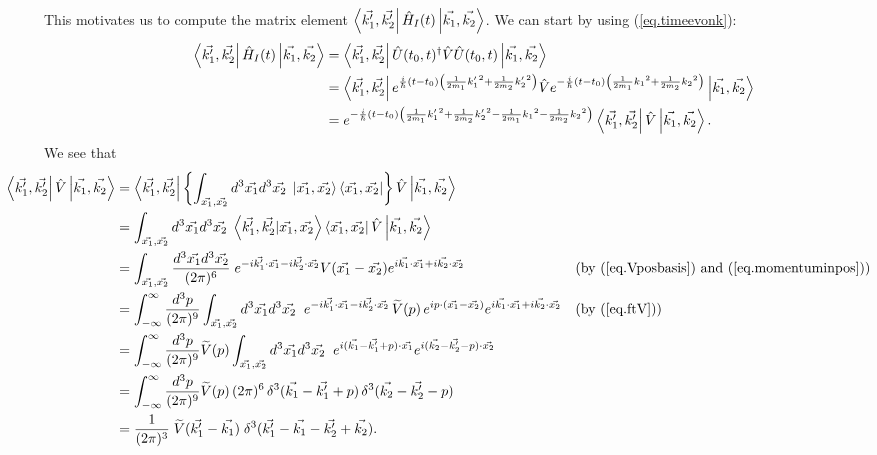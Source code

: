 This motivates us to compute the matrix element \(\left\langle\vec{k_1^\prime}, \vec{k_2^\prime}\right| \hat{H}_I(t)\left|\vec{k_1}, \vec{k_2}\right\rangle\). We can start by using (\ref{eq.timeevonk}):
\begin{align*}
\left\langle\vec{k_1^\prime}, \vec{k_2^\prime}\right| \hat{H}_I(t)\left|\vec{k_1}, \vec{k_2}\right\rangle
&= \left\langle\vec{k_1^\prime}, \vec{k_2^\prime}\right| \hat{U}(t_0, t)^\dagger \hat{V} \hat{U}(t_0, t) \left|\vec{k_1}, \vec{k_2}\right\rangle \nonumber\\
&= \left\langle\vec{k_1^\prime}, \vec{k_2^\prime}\right| e^{\frac{i}{\hbar}\left(t-t_0\right)\left(\frac{1}{2m_1}{{k_1^\prime}}^2 + \frac{1}{2m_2}{{k_2^\prime}}^2\right)} \hat{V} e^{-\frac{i}{\hbar}\left(t-t_0\right)\left(\frac{1}{2m_1}{k_1}^2 + \frac{1}{2m_2}{k_2}^2\right)} \left|\vec{k_1}, \vec{k_2}\right\rangle \nonumber\\
&= e^{-\frac{i}{\hbar}\left(t-t_0\right)\left(\frac{1}{2m_1}{{k_1^\prime}}^2 + \frac{1}{2m_2}{{k_2^\prime}}^2 - \frac{1}{2m_1}{k_1}^2 - \frac{1}{2m_2}{k_2}^2\right)} \left\langle\vec{k_1^\prime}, \vec{k_2^\prime}\right| \hat{V} \left|\vec{k_1}, \vec{k_2}\right\rangle.
\end{align*}
We see that
\begin{align*}
\hspace{-4em}\bra{\vec{k_1^\prime}, \vec{k_2^\prime}} \op{V} \ket{\vec{k_1}, \vec{k_2}} &= \bra{\vec{k_1^\prime}, \vec{k_2^\prime}} \left\{\int_{\vec{x_1}, \vec{x_2}} {d^3 \vec{x_1} d^3 \vec{x_2}\;} \ket{\vec{x_1}, \vec{x_2}}\bra{\vec{x_1}, \vec{x_2}}\right\}\op{V} \ket{\vec{k_1}, \vec{k_2}} \nonumber\\
&= \int_{\vec{x_1}, \vec{x_2}} {d^3 \vec{x_1} d^3 \vec{x_2}\;} \braket{\vec{k_1^\prime}, \vec{k_2^\prime}}{\vec{x_1}, \vec{x_2}}\bra{\vec{x_1}, \vec{x_2}}\op{V} \ket{\vec{k_1}, \vec{k_2}} \nonumber\\
&= \int_{\vec{x_1}, \vec{x_2}} \frac{d^3 \vec{x_1} d^3 \vec{x_2}}{(2\pi)^6}\; e^{-i\vec{k_1^\prime}\cdot \vec{x_1} - i\vec{k_2^\prime}\cdot \vec{x_2}}V(\vec{x_1} - \vec{x_2}) e^{i\vec{k_1}\cdot \vec{x_1} + i\vec{k_2}\cdot \vec{x_2}} &&\text{(by (\ref{eq.Vposbasis}) and (\ref{eq.momentuminpos}))}\nonumber\\
&= \int_{-\infty}^{\infty} \frac{d^3p}{(2\pi)^9}\int_{\vec{x_1}, \vec{x_2}} {d^3 \vec{x_1} d^3 \vec{x_2}\;\;}e^{-i\vec{k_1^\prime}\cdot \vec{x_1} - i\vec{k_2^\prime}\cdot \vec{x_2}}\,\widetilde{V}(p)\,e^{ip\cdot(\vec{x_1}-\vec{x_2})} e^{i\vec{k_1}\cdot \vec{x_1} + i\vec{k_2}\cdot \vec{x_2}}
&&\text{(by (\ref{eq.ftV}))}\nonumber\\
&= \int_{-\infty}^{\infty} \frac{d^3p}{(2\pi)^9}\widetilde{V}(p) \int_{\vec{x_1}, \vec{x_2}} {d^3 \vec{x_1} d^3 \vec{x_2}\;\;}e^{i(\vec{k_1}-\vec{k_1^\prime}+p)\cdot \vec{x_1}}e^{i(\vec{k_2}-\vec{k_2^\prime}-p)\cdot \vec{x_2}}\nonumber\\
&= \int_{-\infty}^{\infty} \frac{d^3p}{(2\pi)^9}\widetilde{V}(p) \,(2\pi)^6\,\delta^3(\vec{k_1}-\vec{k_1^\prime}+p)\,\delta^3(\vec{k_2}-\vec{k_2^\prime}-p)\nonumber\\
&= \frac{1}{(2\pi)^3}\;\widetilde{V}(\vec{k_1^\prime}-\vec{k_1}) \;\delta^3(\vec{k_1^\prime}-\vec{k_1}-\vec{k_2^\prime}+\vec{k_2}).
\end{align*}
